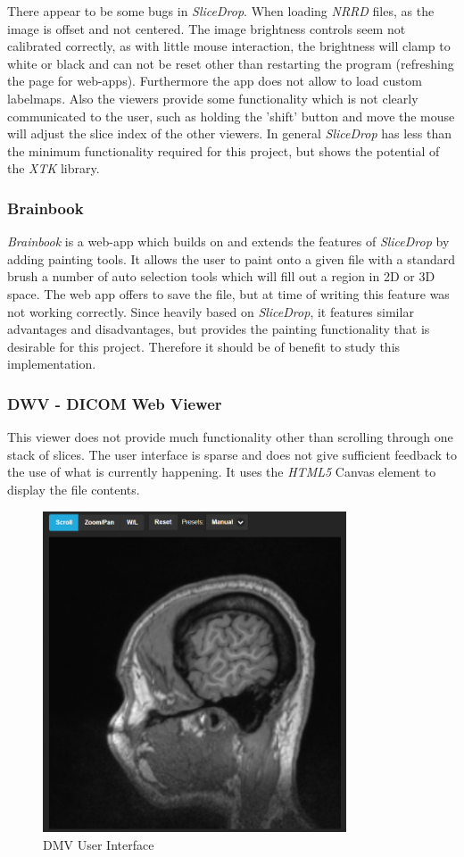 \documentclass[a4paper,11pt,titlepage]{article}
\begin{document}
There appear to be some bugs in \textit{SliceDrop}. When loading \textit{NRRD} files, as the image is offset and not centered. The image brightness controls seem not calibrated correctly, as with little mouse interaction, the brightness will clamp to white or black and can not be reset other than restarting the program (refreshing the page for web-apps). Furthermore the app does not allow to load custom labelmaps. Also the viewers provide some functionality which is not clearly communicated to the user, such as holding the 'shift' button and move the mouse will adjust the slice index of the other viewers. In general \textit{SliceDrop} has less than the minimum functionality required for this project, but shows the potential of the \textit{XTK} library. 


\subsubsection{Brainbook}
\textit{Brainbook}\cite{brainbook} is a web-app which builds on and extends the features of \textit{SliceDrop} by adding painting tools. It allows the user to paint onto a given file with a standard brush a number of auto selection tools which will fill out a region in 2D or 3D space. The web app offers to save the file, but at time of writing this feature was not working correctly. Since heavily based on \textit{SliceDrop}, it features similar advantages and disadvantages, but provides the painting functionality that is desirable for this project. Therefore it should be of benefit to study this implementation.

\subsubsection{DWV - DICOM Web Viewer}
This viewer does not provide much functionality other than scrolling through one stack of slices. The user interface is sparse and does not give sufficient feedback to the use of what is currently happening. It uses the \textit{HTML5} Canvas element to display the file contents.

\begin{figure}[ht!]
\centering
\includegraphics[width=90mm]{..//literatureSurvey/graphics/webViewer_01.png}
\caption{DMV User Interface}
\label{fig:UIdesign1}
\end{figure}
\end{document}
